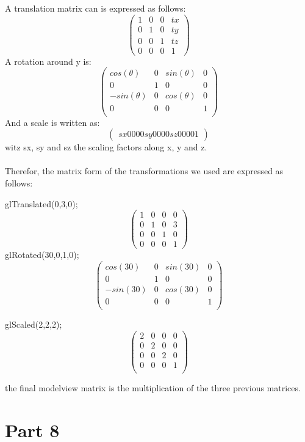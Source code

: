 A translation matrix can is expressed as follows:
$$
\begin{pmatrix}
	1&	0& 	0&	tx\\
	0&	1&	0&	ty\\
	0&	0&	1&	tz\\
	0&	0&	0&	1
\end{pmatrix}
$$
A rotation around y is:
$$
\begin{pmatrix}
	cos(\theta)&	0& 	sin(\theta)&	0\\
	0&	        1&	0&	        0\\
	-sin(\theta)&	0&	cos(\theta)&	0\\
	0&	        0&	0&	        1\\
\end{pmatrix}
$$
And a scale is written as:
$$
\begin{pmatrix}
	sx	0 	0	0
	0	sy	0	0
	0	0	sz	0
	0	0	0	1
\end{pmatrix}
$$
witz sx, sy and sz the scaling factors along x, y and z.\\
~\\
Therefor, the matrix form of the transformations we used are expressed as follows:

glTranslated(0,3,0);
$$
\begin{pmatrix}
	1&	0& 	0&	0\\
	0&	1&	0&	3\\
	0&	0&	1&	0\\
	0&	0&	0&	1
\end{pmatrix}$$
glRotated(30,0,1,0);
$$\begin{pmatrix}
	cos(30)&	0& 	sin(30)&	0\\
	0&	        1&	0&	        0\\
	-sin(30)&	0&	cos(30)&	0\\
	0&	        0&	0&	        1\\
\end{pmatrix}$$

glScaled(2,2,2);
$$\begin{pmatrix}
	2&	0& 	0&	0\\
	0&	2&	0&	0\\
	0&	0&	2&	0\\
	0&	0&	0&	1\\
\end{pmatrix}$$

the final modelview matrix is the multiplication of the three previous matrices.


\section{Part 8}

